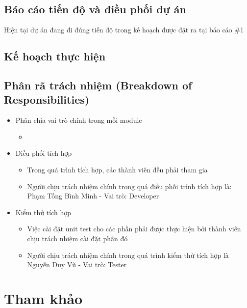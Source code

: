 \documentclass[a4paper, 12pt]{article}
\begin{document}
\subsection{Báo cáo tiến độ và điều phối dự án}

Hiện tại dự án đang đi đúng tiến độ trong kế hoạch được đặt ra tại báo cáo \#1

\subsection{Kế hoạch thực hiện}

\subsection{Phân rã trách nhiệm (Breakdown of Responsibilities)}

\begin{itemize}
	\item Phân chia vai trò chính trong mỗi module
	\begin{itemize}
		\item 
	\end{itemize}

	\item Điều phối tích hợp
	\begin{itemize}
		\item Trong quá trình tích hợp, các thành viên đều phải tham gia
		\item Người chịu trách nhiệm chính trong quá điều phối trình tích hợp là: Phạm Tống Bình Minh - Vai trò: Developer
	\end{itemize}

	\item Kiểm thử tích hợp
	\begin{itemize}
		\item Việc cài đặt unit test cho các phần phải được thực hiện bởi thành viên chịu trách nhiệm cài đặt phần đó
		\item Người chịu trách nhiệm chính trong quá trình kiểm thử tích hợp là Nguyễn Duy Vũ - Vai trò: Tester
	\end{itemize}
\end{itemize}

\clearpage

\section{Tham khảo}
\clearpage
	
\end{document}

